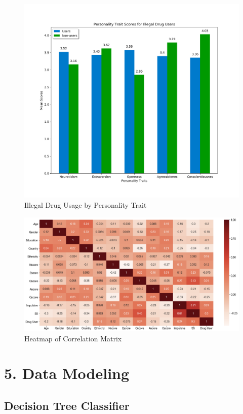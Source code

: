 \documentclass[10pt]{article}
\begin{document}
\begin{figure}[H]
\caption{Illegal Drug Usage by Personality Trait}
\centering
\includegraphics[scale=0.25]{traits.png}
\end{figure}

\begin{figure}[H]
\caption{Heatmap of Correlation Matrix}
\centering
\includegraphics[scale=0.25]{heatmap.png}
\end{figure}

\section*{5. Data Modeling}

\subsection*{Decision Tree Classifier}
\end{document}
